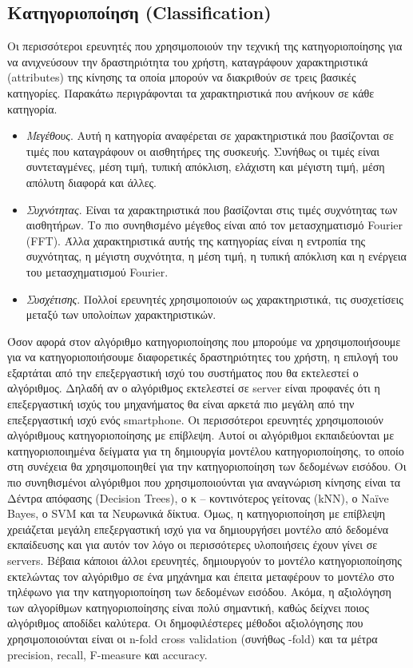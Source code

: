 \documentclass[12pt,twoside,openright]{report}
\begin{document}
\subsection[Κατηγοριοποίηση]{Κατηγοριοποίηση (\lt Classification) \gt}
Οι περισσότεροι ερευνητές που χρησιμοποιούν την τεχνική της κατηγοριοποίησης για να ανιχνεύσουν την δραστηριότητα του χρήστη, καταγράφουν χαρακτηριστικά \lt (attributes) \gt της κίνησης τα οποία μπορούν να διακριθούν σε τρεις βασικές κατηγορίες. Παρακάτω περιγράφονται τα χαρακτηριστικά που ανήκουν σε κάθε κατηγορία.
\begin{itemize}
\item\emph{Μεγέθους}. Αυτή η κατηγορία αναφέρεται σε χαρακτηριστικά που βασίζονται σε τιμές που καταγράφουν οι αισθητήρες της συσκευής. Συνήθως οι τιμές είναι συντεταγμένες, μέση τιμή, τυπική απόκλιση, ελάχιστη και μέγιστη τιμή, μέση απόλυτη διαφορά και άλλες. 
\item\emph{Συχνότητας}. Είναι τα χαρακτηριστικά που βασίζονται στις τιμές συχνότητας των αισθητήρων. Το πιο συνηθισμένο μέγεθος είναι από τον μετασχηματισμό Fourier (FFT). Άλλα χαρακτηριστικά αυτής της κατηγορίας είναι η εντροπία της συχνότητας, η μέγιστη συχνότητα, η μέση τιμή, η τυπική απόκλιση και η ενέργεια του μετασχηματισμού Fourier.
\item\emph{Συσχέτισης}. Πολλοί ερευνητές χρησιμοποιούν ως χαρακτηριστικά, τις συσχετίσεις μεταξύ των υπολοίπων χαρακτηριστικών.
\end{itemize}
	Όσον αφορά στον αλγόριθμο κατηγοριοποίησης που μπορούμε να χρησιμοποιήσουμε για να κατηγοριοποιήσουμε διαφορετικές δραστηριότητες του χρήστη, η επιλογή του εξαρτάται από την επεξεργαστική ισχύ του συστήματος που θα εκτελεστεί ο αλγόριθμος. Δηλαδή αν ο αλγόριθμος εκτελεστεί σε \lt server \gt είναι προφανές ότι η επεξεργαστική ισχύς του μηχανήματος θα είναι αρκετά πιο μεγάλη από την επεξεργαστική ισχύ ενός \lt smartphone. \gt Οι περισσότεροι ερευνητές χρησιμοποιούν αλγόριθμους κατηγοριοποίησης με επίβλεψη. Αυτοί οι αλγόριθμοι εκπαιδεύονται με κατηγοριοποιημένα δείγματα για τη δημιουργία μοντέλου κατηγοριοποίησης, το οποίο στη συνέχεια θα χρησιμοποιηθεί για την κατηγοριοποίηση των δεδομένων εισόδου. Οι πιο συνηθισμένοι αλγόριθμοι που χρησιμοποιούνται για αναγνώριση κίνησης είναι τα Δέντρα απόφασης \lt (Decision Trees), \gt ο κ – κοντινότερος γείτονας \lt (kNN), \gt ο \lt Naïve Bayes, \gt ο \lt SVM \gt και τα Νευρωνικά δίκτυα. Όμως, η κατηγοριοποίηση με επίβλεψη χρειάζεται μεγάλη επεξεργαστική ισχύ για να δημιουργήσει μοντέλο από δεδομένα εκπαίδευσης και για αυτόν τον λόγο οι περισσότερες υλοποιήσεις έχουν γίνει σε \lt servers. \gt Βέβαια κάποιοι άλλοι ερευνητές, δημιουργούν το μοντέλο κατηγοριοποίησης εκτελώντας τον αλγόριθμο σε ένα μηχάνημα και έπειτα μεταφέρουν το μοντέλο στο τηλέφωνο για την κατηγοριοποίηση των δεδομένων εισόδου. Ακόμα, η αξιολόγηση των αλγορίθμων κατηγοριοποίησης είναι πολύ σημαντική, καθώς δείχνει ποιος αλγόριθμος αποδίδει καλύτερα. Οι δημοφιλέστερες μέθοδοι αξιολόγησης που χρησιμοποιούνται είναι οι \lt n-fold cross validation (\gt συνήθως -fold) \gt και τα μέτρα \lt precision, recall, F-measure \gt και \lt accuracy. \gt \cite{bin2012classification}
\end{document}
